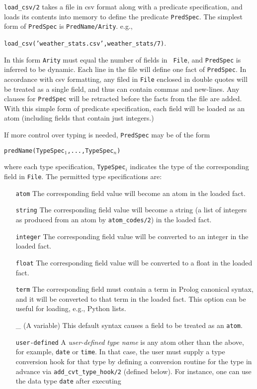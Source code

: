 \begin{description}


{\tt load\_csv/2} takes a file in csv format along with a predicate
specification, and loads its contents into memory to define
the predicate {\tt PredSpec}.  The simplest form of {\tt PredSpec} is
{\tt PredName/Arity}. e.g.,

{\tt load\_csv('weather\_stats.csv',weather\_stats/7)}.

In this form {\tt Arity} must equal the number of fields in {\tt
  File}, and {\tt PredSpec} is inferred to be dynamic.  Each line in
the file will define one fact of {\tt PredSpec}.  In accordance with
csv formatting, any filed in {\tt File} enclosed in double quotes will
be treated as a single field, and thus can contain commas and
new-lines.  Any clauses for {\tt PredSpec} will be retracted before
the facts from the file are added.  With this simple form of predicate
specification, each field will be loaded as an atom (including fields
that contain just integers.)

If more control over typing is needed, {\tt PredSpec} may be of the
form

{\tt predName(TypeSpec$_1$,...,TypeSpec$_n$)}

where each type specification, {\tt TypeSpec$_i$} indicates the type
of the corresponding field in {\tt File}.  The permitted type
specifications are:
\begin{itemize}
\item[{\tt atom}] The corresponding field value will become an atom in
the loaded fact.
\item[{\tt string}] The corresponding field value will become a string
  (a list of integers as produced from an atom by {\tt atom\_codes/2})
  in the loaded fact.
\item[{\tt integer}] The corresponding field value will be converted
to an integer in the loaded fact.
\item[{\tt float}] The corresponding field value will be converted to
a float in the loaded fact.
\item[{\tt term}] The corresponding field must contain a term in
  Prolog canonical syntax, and it will be converted to that term in
  the loaded fact.  This option can be useful for loading, e.g.,
  Python lists.
\item[\_] (A variable) This default syntax causes a field to be
  treated as an {\tt atom}.
\item[{\tt user-defined}]
%
  A \emph{user-defined type name} is any atom other than the above,
  for example, \texttt{date} or \texttt{time}.  In that case, the user
  must supply a type conversion hook for that type by defining a
  conversion routine for the type in advance via
  \texttt{add\_cvt\_type\_hook/2} (defined below).  For instance, one
  can use the data type \texttt{date} after executing
  

\end{itemize}
\end{description}
